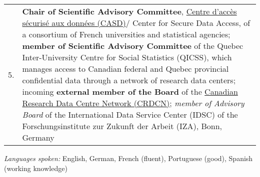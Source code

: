 \documentclass[10pt,letterpaper]{article}
\begin{document}
\begin{longtable}{lp{6.3in}}
5. & {{ \bf Chair of Scientific Advisory Committee}, \href{https://casd.eu}{Centre d'acc\`es s\'ecuris\'e aux donn\'ees (CASD)}/ Center for Secure Data Access, of a consortium of French universities and statistical agencies;
	 \textbf{member of Scientific Advisory Committee} of the Quebec Inter-University Centre for Social Statistics (QICSS), which manages access to Canadian federal and Quebec provincial confidential data through a network of research data centers; incoming \textbf{external member of the Board} of the \href{https://crdcn.org/crdcn-inaugural-board}{Canadian Research Data Centre Network (CRDCN)};
     \textit{member of Advisory Board } of the International Data Service Center (IDSC) of the  Forschungsinstitute zur Zukunft der Arbeit (IZA), Bonn, Germany}\\


%


\end{longtable}

\textit{Languages spoken:} English, German, French (fluent), Portuguese (good), Spanish (working knowledge)
\end{document}
